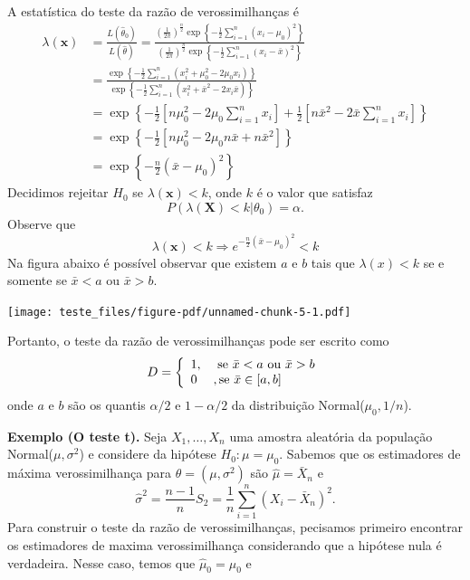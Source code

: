 \documentclass[
  letterpaper,
  DIV=11,
  numbers=noendperiod]{scrartcl}
\begin{document}
A estatística do teste da razão de verossimilhanças é
\[\begin{align}\lambda(\textbf{x})&=\frac{L(\hat{\theta}_0)}{L(\hat{\theta})}=\frac{\left(\frac{1}{2\pi}\right)^{\frac{n}{2}}\exp\left\{-\frac{1}{2}\sum_{i=1}^n(x_i-\mu_0)^2\right\}}{\left(\frac{1}{2\pi}\right)^{\frac{n}{2}}\exp\left\{-\frac{1}{2}\sum_{i=1}^n(x_i-\bar{x})^2\right\}}\\&=\frac{\exp\left\{-\frac{1}{2}\sum_{i=1}^n(x_i^2+\mu_0^2 -2\mu_0x_i)\right\}}{\exp\left\{-\frac{1}{2}\sum_{i=1}^n(x_i^2+\bar{x}^2-2x_i\bar{x})\right\}}\\&=\exp\left\{-\frac{1}{2}\left[n\mu_0^2 -2\mu_0\sum_{i=1}^n x_i\right]+\frac{1}{2}\left[n\bar{x}^2-2\bar{x}\sum_{i=1}^n x_i\right] \right\}\\&=\exp\left\{-\frac{1}{2}\left[n\mu_0^2-2\mu_0 n\bar{x}+n\bar{x}^2\right] \right\}\\&=\exp\left\{-\frac{n}{2}(\bar{x}-\mu_0)^2\right\}\end{align}\]
Decidimos rejeitar \(H_0\) se \(\lambda(\textbf{x})<k\), onde \(k\) é o
valor que satisfaz \[P(\lambda(\textbf{X})<k|\theta_0)=\alpha.\] Observe
que
\[\lambda(\textbf{x})<k\Rightarrow e^{-\frac{n}{2}(\bar{x}-\mu_0)^2}<k\]
Na figura abaixo é possível observar que existem \(a\) e \(b\) tais que
\(\lambda(x)<k\) se e somente se \(\bar{x}<a\) ou \(\bar{x}>b\).

\texttt{[image: teste\_files/figure-pdf/unnamed-chunk-5-1.pdf]}

Portanto, o teste da razão de verossimilhanças pode ser escrito como
\[D=\left\{\begin{array}{ll}1,&\hbox{ se }\bar{x}<a\hbox{ ou } \bar{x}>b\\ 0&, \hbox{se }\bar{x}\in[a,b]\end{array}\right.\]
onde \(a\) e \(b\) são os quantis \(\alpha/2\) e \(1-\alpha/2\) da
distribuição Normal(\(\mu_0,1/n\)).

\textbf{Exemplo (O teste t).} Seja \(X_1,\ldots,X_n\) uma amostra
aleatória da população Normal(\(\mu,\sigma^2\)) e considere da hipótese
\(H_0:\mu=\mu_0\). Sabemos que os estimadores de máxima verossimilhança
para \(\theta=(\mu,\sigma^2)\) são \(\hat{\mu}=\bar{X}_n\) e
\[\hat{\sigma}^2=\frac{n-1}{n}S_2=\frac{1}{n}\sum_{i=1}^n (X_i-\bar{X}_n)^2.\]
Para construir o teste da razão de verossimilhanças, pecisamos primeiro
encontrar os estimadores de maxima verossimilhança considerando que a
hipótese nula é verdadeira. Nesse caso, temos que \(\hat{\mu}_0=\mu_0\)
e
\end{document}
